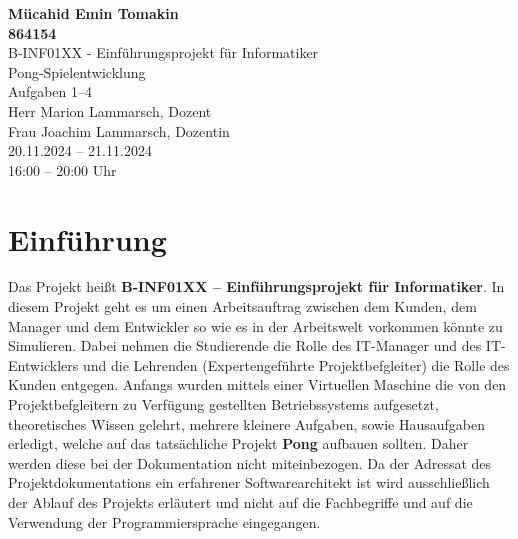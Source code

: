 \documentclass[a4paper,12pt]{article}
\begin{document}
\begin{titlepage}
    \centering
    \vspace*{2cm}
    {\Huge\bfseries Mücahid Emin Tomakin}\\[0.5cm]
    {\Huge\bfseries 864154}\\[0.5cm]
    \vfill
    {\LARGE B-INF01XX - Einführungsprojekt für Informatiker}\\[0.3cm]
    {\large Pong-Spielentwicklung}\\[0.1cm]
    {\large Aufgaben 1–4}\\[1cm]
    {\large Herr Marion Lammarsch, Dozent}\\[0.2cm]
    {\large Frau Joachim Lammarsch, Dozentin}\\[2cm]
    {\large 20.11.2024 – 21.11.2024}\\[0.2cm]
    {\large 16:00 – 20:00 Uhr}\\[2cm]
    \vfill
    \vspace*{1cm}
\end{titlepage}
\clearpage
\renewcommand{\contentsname}{Inhaltsverzeichnis}
\tableofcontents
\clearpage
\listoffigures
{}
\clearpage
\listoftables
{}
\clearpage
\renewcommand{\lstlistlistingname}{Codeverzeichnis}
\lstlistoflistings
{}
\clearpage
\section{Einführung}
Das Projekt heißt \textbf{B-INF01XX – Einführungsprojekt für Informatiker}.
In diesem Projekt geht es um einen Arbeitsauftrag zwischen dem Kunden, dem Manager und dem Entwickler so wie es in der Arbeitswelt vorkommen könnte zu Simulieren. Dabei nehmen die Studierende die Rolle des IT-Manager und des IT-Entwicklers und die Lehrenden (Expertengeführte Projektbefgleiter) die Rolle des Kunden entgegen.
Anfangs wurden mittels einer Virtuellen Maschine die von den Projektbefgleitern zu Verfügung gestellten Betriebssystems aufgesetzt, theoretisches Wissen gelehrt, mehrere kleinere Aufgaben, sowie Hausaufgaben erledigt, welche auf das tatsächliche Projekt \textbf{Pong} aufbauen sollten. Daher werden diese bei der Dokumentation nicht miteinbezogen.
Da der Adressat des Projektdokumentations ein erfahrener Softwarearchitekt ist wird ausschließlich der Ablauf des Projekts erläutert und nicht auf die Fachbegriffe und auf die Verwendung der Programmiersprache eingegangen.
\clearpage
\end{document}
